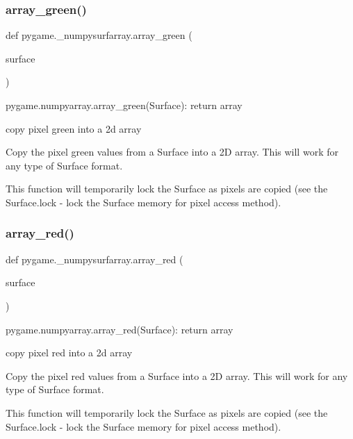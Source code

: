 \subsubsection{\texorpdfstring{array\+\_\+green()}{array\_green()}}
{\footnotesize\ttfamily def pygame.\+\_\+numpysurfarray.\+array\+\_\+green (\begin{DoxyParamCaption}\item[{}]{surface }\end{DoxyParamCaption})}

\begin{DoxyVerb}pygame.numpyarray.array_green(Surface): return array

copy pixel green into a 2d array

Copy the pixel green values from a Surface into a 2D array. This will work
for any type of Surface format.

This function will temporarily lock the Surface as pixels are copied
(see the Surface.lock - lock the Surface memory for pixel access
method).
\end{DoxyVerb}
 \mbox{\label{namespacepygame_1_1__numpysurfarray_a6ecb5f71f0bf8f5fd584c5a94ca2b418}} 
\subsubsection{\texorpdfstring{array\+\_\+red()}{array\_red()}}
{\footnotesize\ttfamily def pygame.\+\_\+numpysurfarray.\+array\+\_\+red (\begin{DoxyParamCaption}\item[{}]{surface }\end{DoxyParamCaption})}

\begin{DoxyVerb}pygame.numpyarray.array_red(Surface): return array

copy pixel red into a 2d array

Copy the pixel red values from a Surface into a 2D array. This will work
for any type of Surface format.

This function will temporarily lock the Surface as pixels are copied
(see the Surface.lock - lock the Surface memory for pixel access
method).
\end{DoxyVerb}
 \mbox{\label{namespacepygame_1_1__numpysurfarray_ae2ebe8cbfe5560d24f9951ac1b0c0de0}} 
